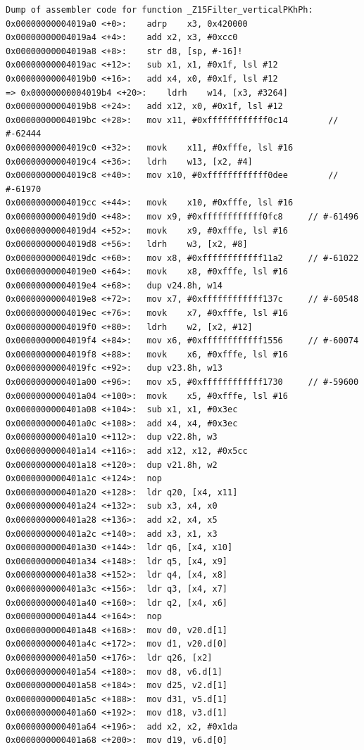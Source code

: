 \documentclass[
  course = {{ESE532 System-on-a-Chip}},
  quartile = {{}},
  assignment = 4,
  name = {{Sheil Sarda, Kate Ballard}},
  studentnumber = {{}},
  email = {{sheils@seas.upenn.edu, kballard@seas.upenn.edu}},
  firstexercise = 1
]{aga-homework}
\begin{document}
\begin{verbatim}
Dump of assembler code for function _Z15Filter_verticalPKhPh:
0x00000000004019a0 <+0>:	adrp	x3, 0x420000
0x00000000004019a4 <+4>:	add	x2, x3, #0xcc0
0x00000000004019a8 <+8>:	str	d8, [sp, #-16]!
0x00000000004019ac <+12>:	sub	x1, x1, #0x1f, lsl #12
0x00000000004019b0 <+16>:	add	x4, x0, #0x1f, lsl #12
=> 0x00000000004019b4 <+20>:	ldrh	w14, [x3, #3264]
0x00000000004019b8 <+24>:	add	x12, x0, #0x1f, lsl #12
0x00000000004019bc <+28>:	mov	x11, #0xffffffffffff0c14    	// #-62444
0x00000000004019c0 <+32>:	movk	x11, #0xfffe, lsl #16
0x00000000004019c4 <+36>:	ldrh	w13, [x2, #4]
0x00000000004019c8 <+40>:	mov	x10, #0xffffffffffff0dee    	// #-61970
0x00000000004019cc <+44>:	movk	x10, #0xfffe, lsl #16
0x00000000004019d0 <+48>:	mov	x9, #0xffffffffffff0fc8    	// #-61496
0x00000000004019d4 <+52>:	movk	x9, #0xfffe, lsl #16
0x00000000004019d8 <+56>:	ldrh	w3, [x2, #8]
0x00000000004019dc <+60>:	mov	x8, #0xffffffffffff11a2    	// #-61022
0x00000000004019e0 <+64>:	movk	x8, #0xfffe, lsl #16
0x00000000004019e4 <+68>:	dup	v24.8h, w14
0x00000000004019e8 <+72>:	mov	x7, #0xffffffffffff137c    	// #-60548
0x00000000004019ec <+76>:	movk	x7, #0xfffe, lsl #16
0x00000000004019f0 <+80>:	ldrh	w2, [x2, #12]
0x00000000004019f4 <+84>:	mov	x6, #0xffffffffffff1556    	// #-60074
0x00000000004019f8 <+88>:	movk	x6, #0xfffe, lsl #16
0x00000000004019fc <+92>:	dup	v23.8h, w13
0x0000000000401a00 <+96>:	mov	x5, #0xffffffffffff1730    	// #-59600
0x0000000000401a04 <+100>:	movk	x5, #0xfffe, lsl #16
0x0000000000401a08 <+104>:	sub	x1, x1, #0x3ec
0x0000000000401a0c <+108>:	add	x4, x4, #0x3ec
0x0000000000401a10 <+112>:	dup	v22.8h, w3
0x0000000000401a14 <+116>:	add	x12, x12, #0x5cc
0x0000000000401a18 <+120>:	dup	v21.8h, w2
0x0000000000401a1c <+124>:	nop
0x0000000000401a20 <+128>:	ldr	q20, [x4, x11]
0x0000000000401a24 <+132>:	sub	x3, x4, x0
0x0000000000401a28 <+136>:	add	x2, x4, x5
0x0000000000401a2c <+140>:	add	x3, x1, x3
0x0000000000401a30 <+144>:	ldr	q6, [x4, x10]
0x0000000000401a34 <+148>:	ldr	q5, [x4, x9]
0x0000000000401a38 <+152>:	ldr	q4, [x4, x8]
0x0000000000401a3c <+156>:	ldr	q3, [x4, x7]
0x0000000000401a40 <+160>:	ldr	q2, [x4, x6]
0x0000000000401a44 <+164>:	nop
0x0000000000401a48 <+168>:	mov	d0, v20.d[1]
0x0000000000401a4c <+172>:	mov	d1, v20.d[0]
0x0000000000401a50 <+176>:	ldr	q26, [x2]
0x0000000000401a54 <+180>:	mov	d8, v6.d[1]
0x0000000000401a58 <+184>:	mov	d25, v2.d[1]
0x0000000000401a5c <+188>:	mov	d31, v5.d[1]
0x0000000000401a60 <+192>:	mov	d18, v3.d[1]
0x0000000000401a64 <+196>:	add	x2, x2, #0x1da
0x0000000000401a68 <+200>:	mov	d19, v6.d[0]

\end{verbatim}
\end{document}
